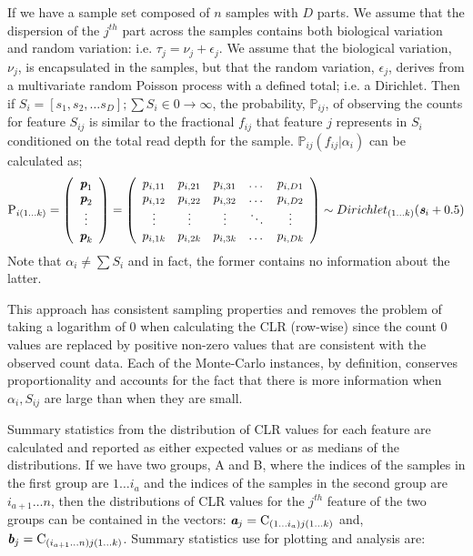 \documentclass[a0,portrait]{a0poster}
\begin{document}
\begin{multicols}{2}
If we have a sample set composed of $n$ samples  with $D$ parts. We assume that the dispersion of the $j^{th}$ part across the samples contains both biological variation and random variation: i.e. $\tau_j=\nu_j + \epsilon_j$. We assume that the biological variation, $\nu_j$, is encapsulated in the samples, but that the random variation, $\epsilon_j$,  derives from a multivariate random Poisson process with a defined total; i.e. a Dirichlet. Then if $S_i = [s_1, s_2, \ldots s_D]; \sum{S_i} \in 0 \to \infty$,  the probability, $\mathbb{P}_{ij}$, of observing the counts for feature $S_{ij}$ is similar to the fractional $f_{ij}$ that  feature $j$ represents in $S_i$ conditioned on the total read depth for the sample. $\mathbb{P}_{ij}(f_{ij}|\alpha_i)$ can be calculated as;
\begin{equation}
\textrm{P}_{i (1 \ldots k)}=
\left( \begin{array}{c}
    \textit{\textbf{p}}_1 \\
   \textit{\textbf{p}}_2 \\
    \vdots \\
    \textit{\textbf{p}}_k \\
\end{array} \right)=
\left( \begin{array}{ccccc}
    p_{i,11} & p_{i,21} & p_{i,31} & \dots  & p_{i,D1} \\
    p_{i,12} & p_{i,22} & p_{i,32} & \dots  & p_{i,D2} \\
    \vdots & \vdots & \vdots & \ddots & \vdots \\
    p_{i,1k} & p_{i,2k} & p_{i,3k} & \dots  & p_{i,Dk}\\
\end{array} \right)
\sim Dirichlet_{(1 \ldots k)}(\textit{\textbf{s}}_i + 0.5)
\label{eq:matrix}
\end{equation}
 Note that $\alpha_i \neq \sum{S_i}$ and in fact, the former contains no information about the latter. 

This approach has consistent sampling properties and removes the problem of taking a logarithm of 0 when calculating the CLR (row-wise) since the count 0 values are replaced by positive non-zero values that are consistent with the observed count data. Each of the Monte-Carlo instances, by definition, conserves proportionality and accounts for the fact that there is more information when $\alpha_i, S_{ij}$ are large than when they are small. 

Summary statistics from the distribution of CLR values for each feature are calculated and reported as either expected values or as medians of the distributions. If we have two groups, A and B, where the indices of the samples in the first group are $1 \ldots i_a$ and the indices of the samples in the second group are $i_{a + 1} \ldots n$, then the distributions of CLR values for the $j^{th}$ feature of the two groups can be contained in the vectors: $\textit{\textbf{a}}_j = \mathrm{C}_{(1 \ldots i_a)j(1...k)}$ and, $\textit{\textbf{b}}_j = \mathrm{C}_{(i_{a + 1} \ldots n)j(1...k)}$. Summary statistics use for plotting and analysis are: 


\end{multicols}
\end{document}
